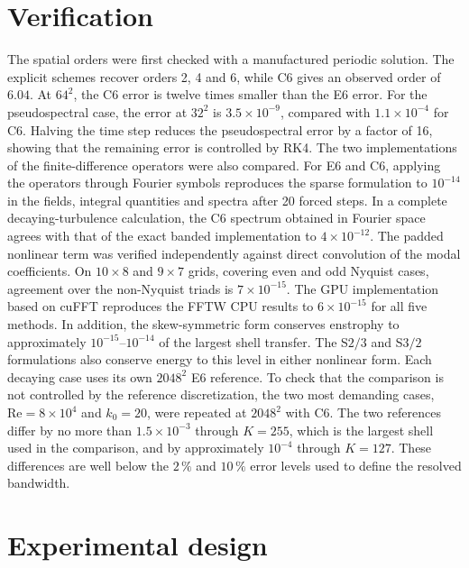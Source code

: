 \documentclass[11pt,a4paper]{article}
\newcommand{\Rey}{\mathrm{Re}}
\begin{document}
\section{Verification}
\label{sec:verification}
The spatial orders were first checked with a manufactured periodic solution. The explicit schemes recover orders 2, 4 and 6, while C6 gives an observed order of $6.04$. At $64^2$, the C6 error is twelve times smaller than the E6 error. For the pseudospectral case, the error at $32^2$ is $3.5\times10^{-9}$, compared with $1.1\times10^{-4}$ for C6. Halving the time step reduces the pseudospectral error by a factor of 16, showing that the remaining error is controlled by RK4.
The two implementations of the finite-difference operators were also compared. For E6 and C6, applying the operators through Fourier symbols reproduces the sparse formulation to $10^{-14}$ in the fields, integral quantities and spectra after 20 forced steps. In a complete decaying-turbulence calculation, the C6 spectrum obtained in Fourier space agrees with that of the exact banded implementation to $4\times10^{-12}$.
The padded nonlinear term was verified independently against direct convolution of the modal coefficients. On $10\times8$ and $9\times7$ grids, covering even and odd Nyquist cases, agreement over the non-Nyquist triads is $7\times10^{-15}$. The GPU implementation based on cuFFT reproduces the FFTW CPU results to $6\times10^{-15}$ for all five methods. In addition, the skew-symmetric form conserves enstrophy to approximately $10^{-15}$--$10^{-14}$ of the largest shell transfer. The S${2/3}$ and S${3/2}$ formulations also conserve energy to this level in either nonlinear form.
Each decaying case uses its own $2048^2$ E6 reference. To check that the comparison is not controlled by the reference discretization, the two most demanding cases, $\Rey=8\times10^4$ and $k_0=20$, were repeated at $2048^2$ with C6. The two references differ by no more than $1.5\times10^{-3}$ through $K=255$, which is the largest shell used in the comparison, and by approximately $10^{-4}$ through $K=127$. These differences are well below the $2\,\%$ and $10\,\%$ error levels used to define the resolved bandwidth.
\section{Experimental design}
\label{sec:design}
\end{document}
